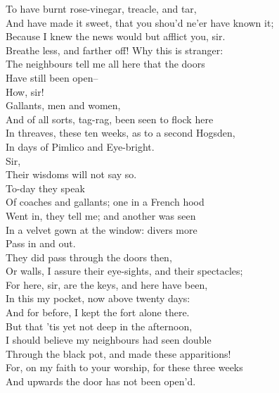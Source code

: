 \documentclass{memoir}
\begin{document}
\begin{drama*}
 To have burnt rose-vinegar, treacle, and tar,\\
 And have made it sweet, that you shou'd ne'er have known it;\\
 Because I knew the news would but afflict you, sir.\\
\lovewitspeaks  Breathe less, and farther off! Why this is stranger:\\
 The neighbours tell me all here that the doors\\
 Have still been open--\\
\facespeaks {} How, sir!\\
\lovewitspeaks {} Gallants, men and women,\\
 And of all sorts, tag-rag, been seen to flock here\\
 In threaves, these ten weeks, as to a second Hogsden,\\
 In days of Pimlico and Eye-bright.\\
\facespeaks {} Sir,\\
 Their wisdoms will not say so.\\
\lovewitspeaks {} To-day they speak\\
 Of coaches and gallants; one in a French hood\\
 Went in, they tell me; and another was seen\\
 In a velvet gown at the window: divers more\\
 Pass in and out.\\
\facespeaks {} They did pass through the doors then,\\
 Or walls, I assure their eye-sights, and their spectacles;\\
 For here, sir, are the keys, and here have been,\\
 In this my pocket, now above twenty days:\\
 And for before, I kept the fort alone there.\\
 But that 'tis yet not deep in the afternoon,\\
 I should believe my neighbours had seen double\\
 Through the black pot, and made these apparitions!\\
 For, on my faith to your worship, for these three weeks\\
 And upwards the door has not been open'd.\\

\end{drama*}
\end{document}
